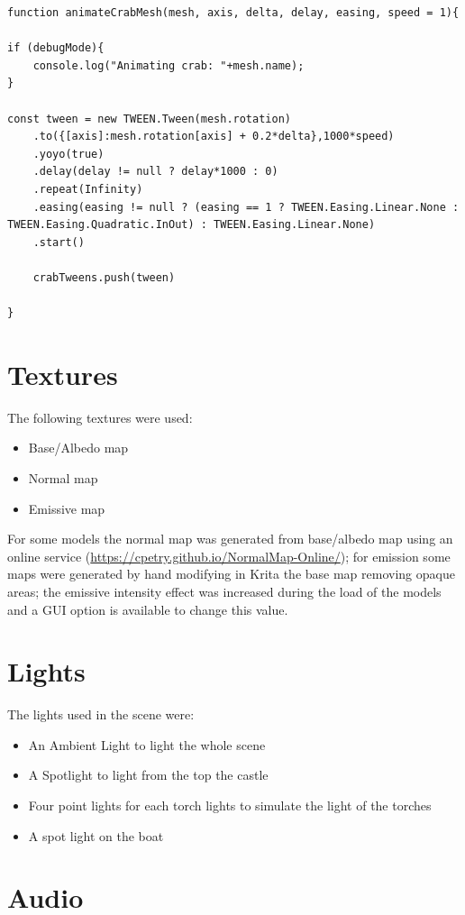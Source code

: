 \documentclass[10pt,a4paper]{article}
\begin{document}
\begin{verbatim}
function animateCrabMesh(mesh, axis, delta, delay, easing, speed = 1){

if (debugMode){
    console.log("Animating crab: "+mesh.name);
}

const tween = new TWEEN.Tween(mesh.rotation)
    .to({[axis]:mesh.rotation[axis] + 0.2*delta},1000*speed)
    .yoyo(true)
    .delay(delay != null ? delay*1000 : 0)
    .repeat(Infinity)
    .easing(easing != null ? (easing == 1 ? TWEEN.Easing.Linear.None : TWEEN.Easing.Quadratic.InOut) : TWEEN.Easing.Linear.None)
    .start()

    crabTweens.push(tween)

}
\end{verbatim}

\section{Textures}
The following textures were used:

\begin{itemize}
\item Base/Albedo map
\item Normal map
\item Emissive map
\end{itemize}

For some models the normal map was generated from base/albedo map using an online service (\url{https://cpetry.github.io/NormalMap-Online/}); for emission some maps were generated by hand modifying in Krita the base map removing opaque areas; the emissive intensity effect was increased during the load of the models and a GUI option is available to change this value.

\section{Lights}
The lights used in the scene were:

\begin{itemize}
\item An Ambient Light to light the whole scene
\item A Spotlight to light from the top the castle
\item Four point lights for each torch lights to simulate the light of the torches
\item A spot light on the boat
\end{itemize}

\section{Audio}
\end{document}
